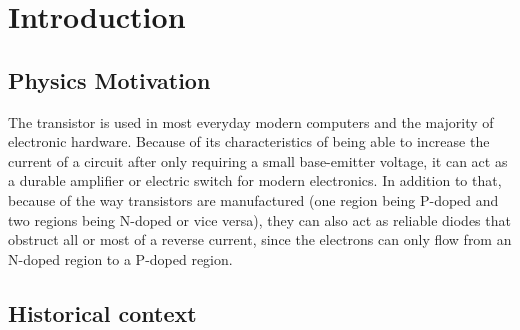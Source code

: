 \documentclass[10pt,letterpaper,onecolumn]{article}
\begin{document}


\section{Introduction}

\subsection{Physics Motivation}

The transistor is used in most everyday modern computers and the majority of electronic hardware. Because of its characteristics of being able to increase the current of a circuit after only requiring a small base-emitter voltage, it can act as a durable amplifier or electric switch for modern electronics. In addition to that, because of the way transistors are manufactured (one region being P-doped and two regions being N-doped or vice versa), they can also act as reliable diodes that obstruct all or most of a reverse current, since the electrons can only flow from an N-doped region to a P-doped region.

\subsection{Historical context}
\end{document}
